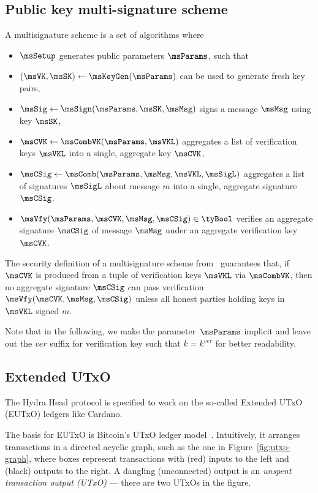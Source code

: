 \subsection{Public key multi-signature scheme}\label{sec:multisig}
\noindent A multisignature scheme is a set of algorithms where
\begin{itemize}
	\item $\msSetup$ generates public parameters $\msParams$, such that
	\item $(\msVK,\msSK) \gets \msKeyGen(\msParams)$ can be used to generate fresh
	      key pairs,
	\item $\msSig \gets \msSign(\msParams,\msSK,\msMsg)$ signs a message $\msMsg$
	      using key $\msSK$,
	\item $\msCVK \gets \msCombVK(\msParams,\msVKL)$ aggregates a list of
	      verification keys $\msVKL$ into a single, aggregate key $\msCVK$,
	\item $\msCSig \gets \msComb(\msParams,\msMsg,\msVKL,\msSigL)$ aggregates a
	      list of signatures $\msSigL$ about message $m$ into a single, aggregate
	      signature~$\msCSig$.
	\item $\msVfy(\msParams,\msCVK,\msMsg,\msCSig) \in \tyBool$ verifies an aggregate
	      signature $\msCSig$ of message $\msMsg$ under an aggregate verification
	      key $\msCVK$.
\end{itemize}

The security definition of a multisignature scheme
from~\cite{itakura1983public,CCS:MicOhtRey01} guarantees that, if $\msCVK$ is
produced from a tuple of verification keys $\msVKL$ via $\msCombVK$, then no
aggregate signature $\msCSig$ can pass verification
$\msVfy(\msCVK,\msMsg,\msCSig)$ unless all honest parties holding keys in
$\msVKL$ signed $m$.

Note that in the following, we make the parameter~$\msParams$ implicit and leave
out the $ver$ suffix for verification key such that $k = k^{ver}$ for better
readability.

\subsection{Extended UTxO}\label{sec:eutxo}
The Hydra Head protocol is specified to work on the so-called Extended UTxO (EUTxO) ledgers
like Cardano.

The basis for EUTxO is Bitcoin's UTxO ledger
model~\cite{formal-model-of-bitcoin-transactions,Zahnentferner18-UTxO}.
Intuitively, it arranges transactions in a directed acyclic graph, such as the
one in Figure~\ref{fig:utxo-graph}, where boxes represent transactions with
(red) inputs to the left and (black) outputs to the right. A dangling
(unconnected) output is an \emph{unspent transaction output (UTxO)} --- there
are two UTxOs in the figure.

